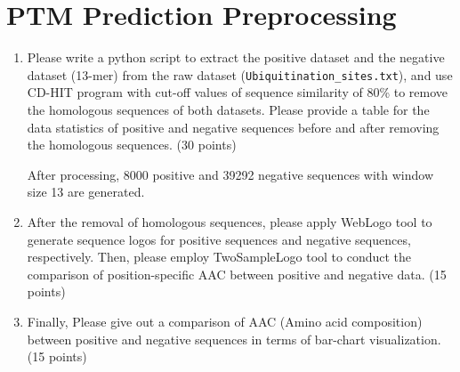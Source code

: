 \documentclass{article}
\begin{document}
\section{PTM Prediction Preprocessing}
\begin{enumerate}
    \item Please write a python script to extract the positive dataset and the negative dataset (13-mer) from the raw dataset (\texttt{Ubiquitination\_sites.txt}), and use CD-HIT program with cut-off values of sequence similarity of 80\% to remove the homologous sequences of both datasets. Please provide a table for the data statistics of positive and negative sequences before and after removing the homologous sequences. (30 points)
    
    After processing, 8000 positive and 39292 negative sequences with window size 13 are generated. 
    \item After the removal of homologous sequences, please apply WebLogo tool to generate sequence logos for positive sequences and negative sequences, respectively. Then, please employ TwoSampleLogo tool to conduct the comparison of position-specific AAC between positive and negative data. (15 points)
    \item Finally, Please give out a comparison of AAC (Amino acid composition) between positive and negative sequences in terms of bar-chart visualization. (15 points)
\end{enumerate}
\end{document}
